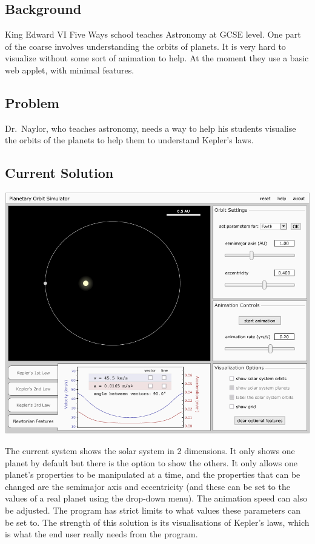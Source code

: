 \subsection{Background}

King Edward VI Five Ways school teaches Astronomy at GCSE level. One part of the
coarse involves understanding the orbits of planets. It is very hard to
visualize without some sort of animation to help. At the moment they use a basic
web applet, with minimal features.
\fi
\subsection{Problem}
Dr.~Naylor, who teaches astronomy, needs a way to help his students visualise
the orbits of the planets to help them to understand Kepler's laws. 

\subsection{Current Solution}
\includegraphics[width=\textwidth]{./img/existing-solution.png}

The current system shows the solar system in 2 dimensions. It only shows one
planet by default but there is the option to show the others. It only allows one
planet's properties to be manipulated at a time, and the properties that can be
changed are the semimajor axis and eccentricity (and these can be set to the
values of a real planet using the drop-down menu). The animation speed can also
be adjusted. The program has strict limits to what values these parameters can
be set to. The strength of this solution is its visualisations of Kepler's laws,
which is what the end user really needs from the program.

